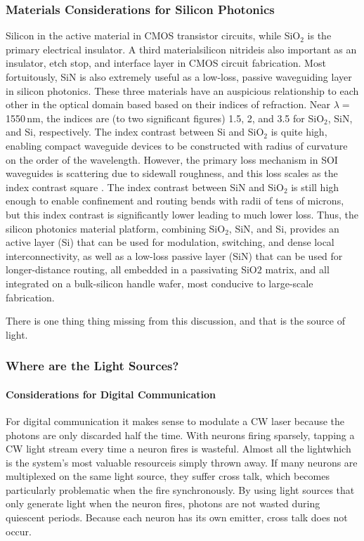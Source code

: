 \subsubsection{Materials Considerations for Silicon Photonics}
Silicon in the active material in CMOS transistor circuits, while SiO$_2$ is the primary electrical insulator. A third material\textemdash silicon nitride\textemdash is also important as an insulator, etch stop, and interface layer in CMOS circuit fabrication. Most fortuitously, SiN is also extremely useful as a low-loss, passive waveguiding layer in silicon photonics. These three materials have an auspicious relationship to each other in the optical domain based based on their indices of refraction. Near $\lambda =$\,1550\,nm, the indices are (to two significant figures) 1.5, 2, and 3.5 for SiO$_2$, SiN, and Si, respectively. The index contrast between Si and SiO$_2$ is quite high, enabling compact waveguide devices to be constructed with radius of curvature on the order of the wavelength. However, the primary loss mechanism in SOI waveguides is scattering due to sidewall roughness, and this loss scales as the index contrast square \cite{vlmc2004}. The index contrast between SiN and SiO$_2$ is still high enough to enable confinement and routing bends with radii of tens of microns, but this index contrast is significantly lower leading to much lower loss. Thus, the silicon photonics material platform, combining SiO$_2$, SiN, and Si, provides an active layer (Si) that can be used for modulation, switching, and dense local interconnectivity, as well as a low-loss passive layer (SiN) that can be used for longer-distance routing, all embedded in a passivating SiO$2$ matrix, and all integrated on a bulk-silicon handle wafer, most conducive to large-scale fabrication.

There is one thing thing missing from this discussion, and that is the source of light.

\subsubsection{Where are the Light Sources?}

\paragraph{Considerations for Digital Communication}
\vspace{3em}
For digital communication it makes sense to modulate a CW laser because the photons are only discarded half the time. With neurons firing sparsely, tapping a CW light stream every time a neuron fires is wasteful. Almost all the light\textemdash which is the system's most valuable resource\textemdash is simply thrown away. If many neurons are multiplexed on the same light source, they suffer cross talk, which becomes particularly problematic when the fire synchronously. By using light sources that only generate light when the neuron fires, photons are not wasted during quiescent periods. Because each neuron has its own emitter, cross talk does not occur. 

